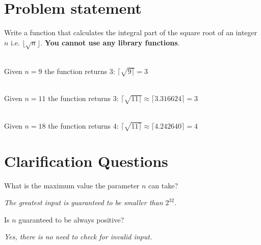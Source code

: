 \section{Problem statement}
	\begin{exercise}
		Write a function that calculates the integral part of the square root of an integer $n$ i.e. $\lfloor \sqrt{n}\rfloor$.
		\textbf{You cannot use any library functions}.


	\begin{example}
	\hfill \\
	Given $n=9$ the function returns $3$: $\lceil\sqrt{9 \rceil}=3$
	\end{example}

	\begin{example}
		\hfill \\
		Given $n=11$ the function returns $3$: $\lceil\sqrt{11 \rceil}\approx\lceil3.316624 \rceil=3$
	\end{example}

	\begin{example}
		\hfill \\
		Given $n=18$ the function returns $4$: $\lceil\sqrt{11 \rceil}\approx\lceil4.242640 \rceil=4$
	\end{example}
	
\end{exercise}

\section{Clarification Questions}
\begin{QandA}
	\item \begin{questionitem} \begin{question} What is the maximum value the parameter $n$ can take?  \end{question}      
    \begin{answered}
		\textit{The greatest input is guaranteed to be smaller than $2^{32}$.}
	\end{answered} \end{questionitem}
	
	\item \begin{questionitem} \begin{question} Is $n$ guaranteed to be always positive?  \end{question}      
    \begin{answered}
		\textit{Yes, there is no need to check for invalid input.}
	\end{answered} \end{questionitem}
\end{QandA}

